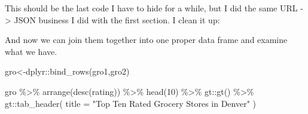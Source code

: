 \documentclass[]{tufte-handout}
\newenvironment{Shaded}{}{}
\newcommand{\AttributeTok}[1]{\textcolor[rgb]{0.49,0.56,0.16}{#1}}
\newcommand{\DecValTok}[1]{\textcolor[rgb]{0.25,0.63,0.44}{#1}}
\newcommand{\FunctionTok}[1]{\textcolor[rgb]{0.02,0.16,0.49}{#1}}
\newcommand{\NormalTok}[1]{#1}
\newcommand{\OtherTok}[1]{\textcolor[rgb]{0.00,0.44,0.13}{#1}}
\newcommand{\SpecialCharTok}[1]{\textcolor[rgb]{0.25,0.44,0.63}{#1}}
\newcommand{\StringTok}[1]{\textcolor[rgb]{0.25,0.44,0.63}{#1}}
\begin{document}
This should be the last code I have to hide for a while, but I did the
same URL -\textgreater{} JSON business I did with the first section. I
clean it up:

\begin{Shaded}
\end{Shaded}

And now we can join them together into one proper data frame and examine
what we have.

\begin{Shaded}
\begin{Highlighting}[]
\NormalTok{gro}\OtherTok{\textless{}{-}}\NormalTok{dplyr}\SpecialCharTok{::}\FunctionTok{bind\_rows}\NormalTok{(gro1,gro2)}


\NormalTok{gro }\SpecialCharTok{\%\textgreater{}\%} 
  \FunctionTok{arrange}\NormalTok{(}\FunctionTok{desc}\NormalTok{(rating)) }\SpecialCharTok{\%\textgreater{}\%} 
  \FunctionTok{head}\NormalTok{(}\DecValTok{10}\NormalTok{) }\SpecialCharTok{\%\textgreater{}\%} 
\NormalTok{  gt}\SpecialCharTok{::}\FunctionTok{gt}\NormalTok{() }\SpecialCharTok{\%\textgreater{}\%} 
\NormalTok{   gt}\SpecialCharTok{::}\FunctionTok{tab\_header}\NormalTok{(}
    \AttributeTok{title =} \StringTok{"Top Ten Rated Grocery Stores in Denver"}
\NormalTok{  ) }
\end{Highlighting}
\end{Shaded}
\end{document}
